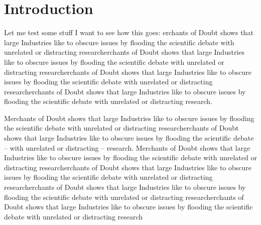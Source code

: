 \section*{Introduction}


Let me test some stuff I want to see how this goes: erchants of Doubt shows that large Industries like to obscure issues by flooding the scientific debate with unrelated or distracting researcherchants of Doubt shows that large Industries like to obscure issues by flooding the scientific debate with unrelated or distracting researcherchants of Doubt shows that large Industries like to obscure issues by flooding the scientific debate with unrelated or distracting researcherchants of Doubt shows that large Industries like to obscure issues by flooding the scientific debate with unrelated or distracting research.

Merchants of Doubt shows that large Industries like to obscure issues by flooding the scientific debate with unrelated or distracting researcherchants of Doubt shows that large Industries like to obscure issues by flooding the scientific debate -- with unrelated or distracting -- research. Merchants of Doubt shows that large Industries like to obscure issues by flooding the scientific debate with unrelated or distracting researcherchants of Doubt shows that large Industries like to obscure issues by flooding the scientific debate with unrelated or distracting researcherchants of Doubt shows that large Industries like to obscure issues by flooding the scientific debate with unrelated or distracting researcherchants of Doubt shows that large Industries like to obscure issues by flooding the scientific debate with unrelated or distracting research

